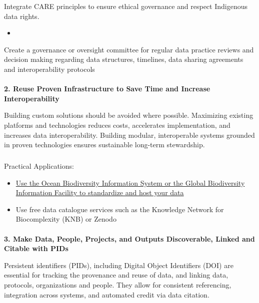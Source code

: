 \documentclass[
  letterpaper,
  DIV=11,
  numbers=noendperiod]{scrartcl}
\makeatletter
\let\oldparagraph\paragraph
\renewcommand{\paragraph}{
    \@ifstar
      \xxxParagraphStar
      \xxxParagraphNoStar
  }
\newcommand{\xxxParagraphStar}[1]{\oldparagraph*{#1}\mbox{}}
\newcommand{\xxxParagraphNoStar}[1]{\oldparagraph{#1}\mbox{}}
\let\oldsubparagraph\subparagraph
\renewcommand{\subparagraph}{
    \@ifstar
      \xxxSubParagraphStar
      \xxxSubParagraphNoStar
  }
\newcommand{\xxxSubParagraphStar}[1]{\oldsubparagraph*{#1}\mbox{}}
\newcommand{\xxxSubParagraphNoStar}[1]{\oldsubparagraph{#1}\mbox{}}
\providecommand{\tightlist}{%
  \setlength{\itemsep}{0pt}\setlength{\parskip}{0pt}}\usepackage{longtable,booktabs,array}
\makeatother
\begin{document}
Integrate CARE principles to ensure ethical governance and respect
Indigenous data rights.

\begin{itemize}
\tightlist
\item
\end{itemize}

Create a governance or oversight committee for regular data practice
reviews and decision making regarding data structures, timelines, data
sharing agreements and interoperability protocols

\paragraph{\texorpdfstring{\textbf{2. Reuse Proven Infrastructure to
Save Time and Increase
Interoperability}}{2. Reuse Proven Infrastructure to Save Time and Increase Interoperability}}\label{reuse-proven-infrastructure-to-save-time-and-increase-interoperability}

Building custom solutions should be avoided where possible. Maximizing
existing platforms and technologies reduces costs, accelerates
implementation, and increases data interoperability. Building modular,
interoperable systems grounded in proven technologies ensures
sustainable long-term stewardship.

\subparagraph{Practical Applications:}\label{practical-applications-1}

\begin{itemize}
\item
  \href{https://doi.org/10.14286/duc6mu}{Use the Ocean Biodiversity
  Information System or the Global Biodiversity Information Facility to
  standardize and host your data}
\item
  Use free data catalogue services such as the Knowledge Network for
  Biocomplexity (KNB) or Zenodo
\end{itemize}

\paragraph{\texorpdfstring{\textbf{3. Make Data, People, Projects, and
Outputs Discoverable, Linked and Citable with
PIDs}}{3. Make Data, People, Projects, and Outputs Discoverable, Linked and Citable with PIDs}}\label{make-data-people-projects-and-outputs-discoverable-linked-and-citable-with-pids}

Persistent identifiers (PIDs), including Digital Object Identifiers
(DOI) are essential for tracking the provenance and reuse of data, and
linking data, protocols, organizations and people. They allow for
consistent referencing, integration across systems, and automated credit
via data citation.
\end{document}
